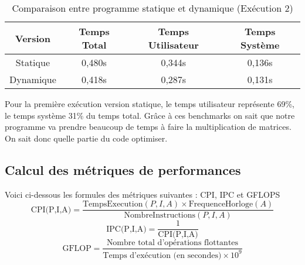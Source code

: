 \documentclass{rapport}
\begin{document}
\begin{table}[h!]
    \centering
    \begin{tabular}{|c|c|c|c|}
        \hline
        Version & Temps Total & Temps Utilisateur & Temps Système \\
        \hline
        Statique & 0,480s & 0,344s & 0,136s \\
        \hline
        Dynamique & 0,418s & 0,287s & 0,131s \\
        \hline
    \end{tabular}
    \caption{Comparaison entre programme statique et dynamique (Exécution 2)}
\end{table}

      Pour la première exécution version statique, le temps utilisateur représente 69\%, le temps système 31\% du temps total.
      Grâce à ces benchmarks on sait que notre programme va prendre beaucoup de temps à faire la multiplication de matrices. On sait donc quelle partie du code optimiser.
    \subsection{Calcul des métriques de performances}
    Voici ci-dessous les formules des métriques suivantes : CPI, IPC et GFLOPS
\[
\text{CPI(P,I,A)} = \frac{\text{TempsExecution}(P, I, A)\times \text{FrequenceHorloge}(A)}{\text{NombreInstructions}(P, I, A)} 
\]
\[
\text{IPC(P,I,A)} = \frac{1}{\text{CPI(P,I,A)}}
\]
\[
\text{GFLOP} = \frac{\text{Nombre total d'opérations flottantes}}{\text{Temps d'exécution (en secondes)} \times 10^9}
\]
\end{document}

